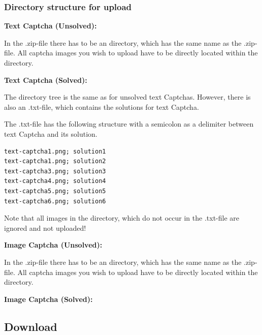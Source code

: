 \clearpage
\subsubsection{Directory structure for upload}

\textbf{Text Captcha (Unsolved):}

In the .zip-file there has to be an directory, which has the same name as the .zip-file. All captcha images you wish to upload have to be directly located within the directory.
\\

\textbf{Text Captcha (Solved):}

The directory tree is the same as for unsolved text Captchas. However, there is also an .txt-file, which contains the solutions for text Captcha.
\\

The .txt-file has the following structure with a semicolon as a delimiter between text Captcha and its solution.

\begin{lstlisting}
text-captcha1.png; solution1
text-captcha1.png; solution2
text-captcha3.png; solution3
text-captcha4.png; solution4
text-captcha5.png; solution5
text-captcha6.png; solution6
\end{lstlisting}

Note that all images in the directory, which do not occur in the .txt-file are ignored and not uploaded!

\clearpage
\textbf{Image Captcha (Unsolved):}

In the .zip-file there has to be an directory, which has the same name as the .zip-file. All captcha images you wish to upload have to be directly located within the directory.
\\

\textbf{Image Captcha (Solved):}

\subsection{Download}

